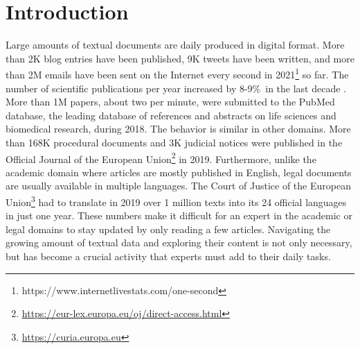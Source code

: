 

\chapter{Introduction}\label{ch:introduction}

\graphicspath{{introduction/figures/}}




Large amounts of textual documents are daily produced in digital format. More than 2K blog entries have been published, 9K tweets have been written, and more than 2M emails have been sent on the Internet every second in 2021\footnote{https://www.internetlivestats.com/one-second} so far. The number of scientific publications per year  increased by 8-9\%~in the last decade \citep{Ware2018STM}. More than 1M papers, about two per minute,  were submitted to the PubMed database, the leading database of references and abstracts on life sciences and biomedical research, during 2018. The behavior is similar in other domains. More than 168K procedural documents and 3K judicial notices were published in the Official Journal of the European Union\footnote{\url{https://eur-lex.europa.eu/oj/direct-access.html}} in 2019. Furthermore, unlike the academic domain where articles are mostly published in English, legal documents are usually available in multiple languages. The Court of Justice of the European Union\footnote{\url{https://curia.europa.eu}} had to translate in 2019 over 1 million texts into its 24 official languages in just one year. These numbers make it difficult for an expert in the academic or legal domains to stay updated by only reading a few articles. Navigating the growing amount of textual data and exploring their content is not only necessary, but has become a crucial activity that experts must add to their daily tasks. 

